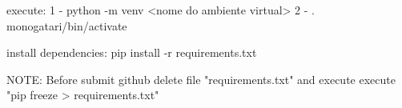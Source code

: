 execute:
1 - python -m venv <nome do ambiente virtual>
2 - . monogatari/bin/activate

install dependencies: 
pip install -r requirements.txt


NOTE: Before submit github delete file "requirements.txt" and execute
execute "pip freeze > requirements.txt"
